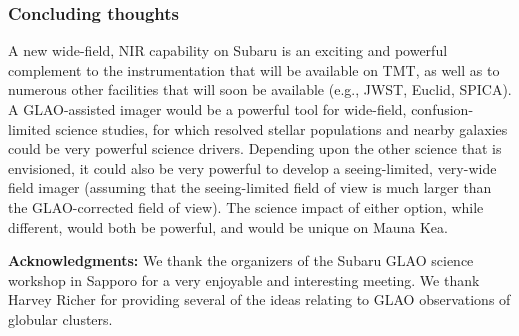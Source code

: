 \subsubsection{Concluding thoughts}

A new wide-field, NIR capability on Subaru is an exciting and powerful
complement to the instrumentation that will be available on TMT, as well
as to numerous other facilities that will soon be available (e.g., JWST,
Euclid, SPICA). A GLAO-assisted imager would be a powerful tool for
wide-field, confusion-limited science studies, for which resolved
stellar populations and nearby galaxies could be very powerful science
drivers. Depending upon the other science that is envisioned, it could
also be very powerful to develop a seeing-limited, very-wide field
imager (assuming that the seeing-limited field of view is much larger
than the GLAO-corrected field of view). The science impact of either
option, while different, would both be powerful, and would be unique on
Mauna Kea. 

\vspace{2cm}
{\bf Acknowledgments:} We thank the organizers of the Subaru GLAO
science workshop in Sapporo for a very enjoyable and interesting
meeting. We thank Harvey Richer for providing several of the ideas
relating to GLAO observations of globular clusters. 

%
